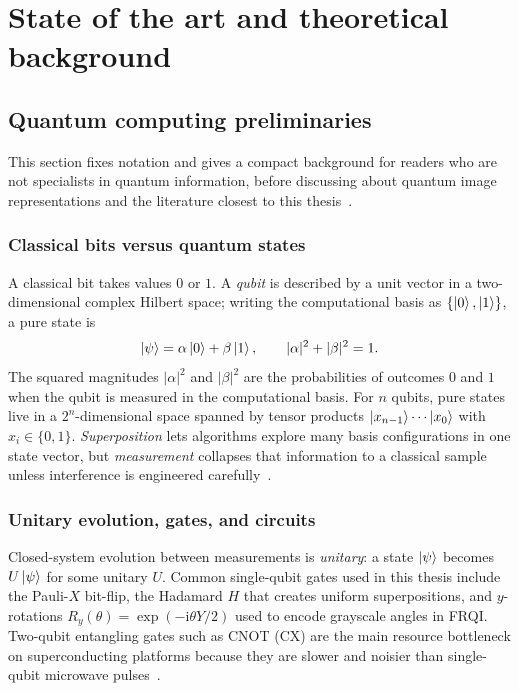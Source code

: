 \chapter{State of the art and theoretical background}\label{ch:related}
\thispagestyle{pagestyle}

\section{Quantum computing preliminaries}
This section fixes notation and gives a compact background for readers who are not specialists in quantum information, before discussing about quantum image representations and the literature closest to this thesis~\cite{NielsenChuang2010,Ruan2021OpportunitiesChallenges,Wang2022ReviewQIP}.

\subsection{Classical bits versus quantum states}
A classical bit takes values $0$ or $1$. A \emph{qubit} is described by a unit vector in a two-dimensional complex Hilbert space; writing the computational basis as $\{\ket{0},\ket{1}\}$, a pure state is
\begin{equation}
\ket{\psi} = \alpha\ket{0} + \beta\ket{1}, \qquad |\alpha|^2 + |\beta|^2 = 1 .
\end{equation}
The squared magnitudes $|\alpha|^2$ and $|\beta|^2$ are the probabilities of outcomes $0$ and $1$ when the qubit is measured in the computational basis. For $n$ qubits, pure states live in a $2^n$-dimensional space spanned by tensor products $\ket{x_{n-1}}\cdots\ket{x_0}$ with $x_i\in\{0,1\}$. \emph{Superposition} lets algorithms explore many basis configurations in one state vector, but \emph{measurement} collapses that information to a classical sample unless interference is engineered carefully~\cite{NielsenChuang2010}.

\subsection{Unitary evolution, gates, and circuits}
Closed-system evolution between measurements is \emph{unitary}: a state $\ket{\psi}$ becomes $U\ket{\psi}$ for some unitary $U$. Common single-qubit gates used in this thesis include the Pauli-$X$ bit-flip, the Hadamard $H$ that creates uniform superpositions, and $y$-rotations $R_y(\theta)=\exp(-\mathrm{i}\theta Y/2)$ used to encode grayscale angles in FRQI. Two-qubit entangling gates such as CNOT (CX) are the main resource bottleneck on superconducting platforms because they are slower and noisier than single-qubit microwave pulses~\cite{Geng2023ImprovedFRQI}.

